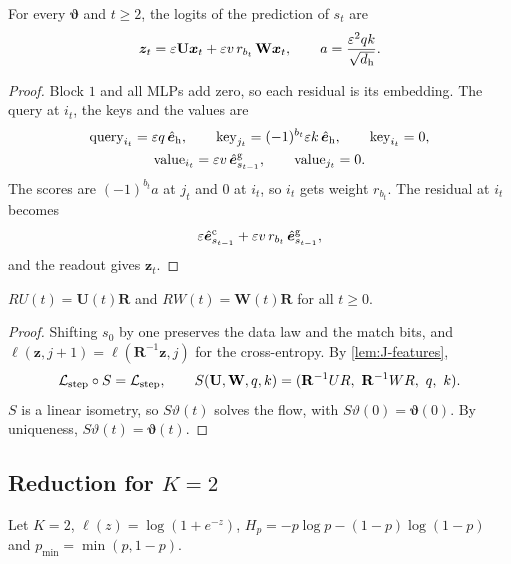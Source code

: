\begin{lemma}
\label{lem:J-features}
For every $\bm\vartheta$ and $t\ge2$, the logits of the prediction of $s_t$ are
\[
 \bm z_t=\varepsilon \mathbf U\bm x_t+\varepsilon v\,r_{b_t}\,\mathbf W\bm x_t,\qquad a=\frac{\varepsilon^2qk}{\sqrt{d_{\mathrm h}}}.
\]
\end{lemma}

\begin{proof}
Block $1$ and all MLPs add zero, so each residual is its embedding. The query at $i_t$, the keys and the values are
\begin{gather*}
 \text{query}_{i_t}=\varepsilon q\,\hat{\bm e}_{\mathrm h},\qquad \text{key}_{j_t}=(-1)^{b_t}\varepsilon k\,\hat{\bm e}_{\mathrm h},\qquad \text{key}_{i_t}=0,\\
 \text{value}_{i_t}=\varepsilon v\,\hat{\bm e}^{\mathrm g}_{s_{t-1}},\qquad \text{value}_{j_t}=0 .
\end{gather*}
The scores are $(-1)^{b_t}a$ at $j_t$ and $0$ at $i_t$, so $i_t$ gets weight $r_{b_t}$. The residual at $i_t$ becomes
\[
 \varepsilon\hat{\bm e}^{\mathrm c}_{s_{t-1}}+\varepsilon v\,r_{b_t}\,\hat{\bm e}^{\mathrm g}_{s_{t-1}},
\]
and the readout gives $\bm z_t$.
\end{proof}

\begin{lemma}
\label{lem:J-symmetry}
$RU(t)=\mathbf U(t)\mathbf R$ and $RW(t)=\mathbf W(t)\mathbf R$ for all $t\ge0$.
\end{lemma}

\begin{proof}
Shifting $s_0$ by one preserves the data law and the match bits, and $\ell(\bm z,j+1)=\ell(\mathbf R^{-1}\bm z,j)$ for the cross-entropy. By \cref{lem:J-features},
\[
 \mathcal L_{\mathrm{step}}\circ S=\mathcal L_{\mathrm{step}},\qquad S(\mathbf U,\mathbf W,q,k)=(\mathbf R^{-1}UR,\ \mathbf R^{-1}WR,\ q,\ k).
\]
$S$ is a linear isometry, so $S\vartheta(t)$ solves the flow, with $S\vartheta(0)=\bm\vartheta(0)$. By uniqueness, $S\vartheta(t)=\bm\vartheta(t)$.
\end{proof}

\subsection{Reduction for \texorpdfstring{$K=2$}{K = 2}}

Let $K=2$, $\ell(z)=\log(1+e^{-z})$, $H_p=-p\log p-(1-p)\log(1-p)$ and $p_{\min}=\min(p,1-p)$.

